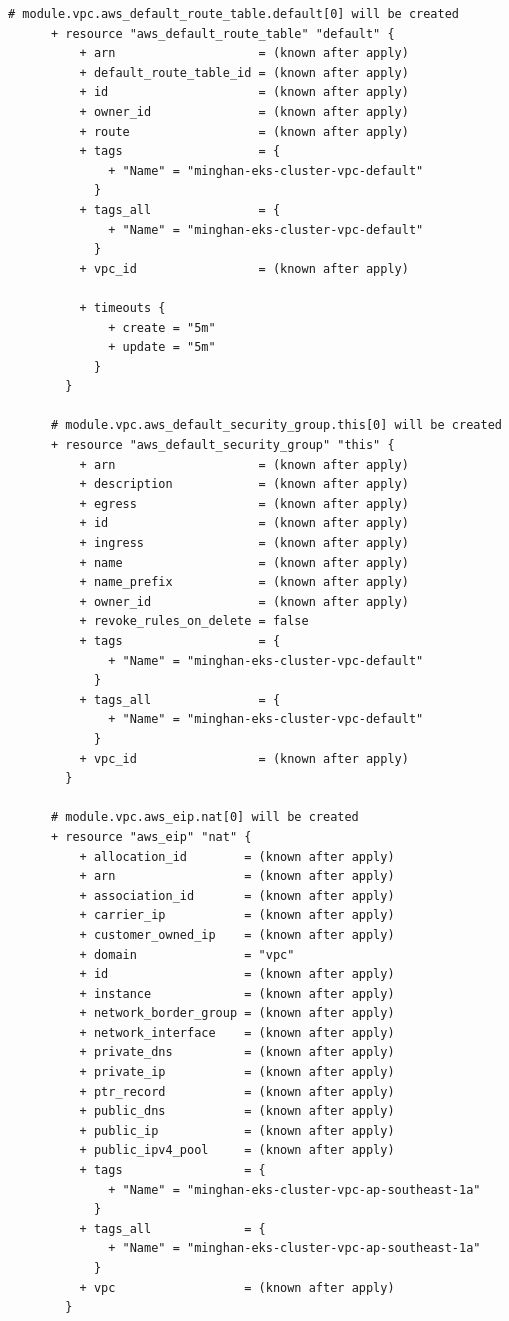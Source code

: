\begin{lstlisting}[caption={terraform plan output for \texttt{cloudkube} provisioning}, breaklines=true, breakatwhitespace=false]
      # module.vpc.aws_default_route_table.default[0] will be created
      + resource "aws_default_route_table" "default" {
          + arn                    = (known after apply)
          + default_route_table_id = (known after apply)
          + id                     = (known after apply)
          + owner_id               = (known after apply)
          + route                  = (known after apply)
          + tags                   = {
              + "Name" = "minghan-eks-cluster-vpc-default"
            }
          + tags_all               = {
              + "Name" = "minghan-eks-cluster-vpc-default"
            }
          + vpc_id                 = (known after apply)
    
          + timeouts {
              + create = "5m"
              + update = "5m"
            }
        }
    
      # module.vpc.aws_default_security_group.this[0] will be created
      + resource "aws_default_security_group" "this" {
          + arn                    = (known after apply)
          + description            = (known after apply)
          + egress                 = (known after apply)
          + id                     = (known after apply)
          + ingress                = (known after apply)
          + name                   = (known after apply)
          + name_prefix            = (known after apply)
          + owner_id               = (known after apply)
          + revoke_rules_on_delete = false
          + tags                   = {
              + "Name" = "minghan-eks-cluster-vpc-default"
            }
          + tags_all               = {
              + "Name" = "minghan-eks-cluster-vpc-default"
            }
          + vpc_id                 = (known after apply)
        }
    
      # module.vpc.aws_eip.nat[0] will be created
      + resource "aws_eip" "nat" {
          + allocation_id        = (known after apply)
          + arn                  = (known after apply)
          + association_id       = (known after apply)
          + carrier_ip           = (known after apply)
          + customer_owned_ip    = (known after apply)
          + domain               = "vpc"
          + id                   = (known after apply)
          + instance             = (known after apply)
          + network_border_group = (known after apply)
          + network_interface    = (known after apply)
          + private_dns          = (known after apply)
          + private_ip           = (known after apply)
          + ptr_record           = (known after apply)
          + public_dns           = (known after apply)
          + public_ip            = (known after apply)
          + public_ipv4_pool     = (known after apply)
          + tags                 = {
              + "Name" = "minghan-eks-cluster-vpc-ap-southeast-1a"
            }
          + tags_all             = {
              + "Name" = "minghan-eks-cluster-vpc-ap-southeast-1a"
            }
          + vpc                  = (known after apply)
        }
    

\end{lstlisting}
